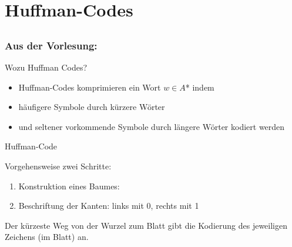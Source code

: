 

\section{Huffman-Codes}
\subsection*{}
\begin{frame}
	\frametitle{Aus der Vorlesung:}
	\begin{block}{Wozu Huffman Codes?}
    		\begin{itemize}
              \item Huffman-Codes komprimieren ein Wort $w \in A$* indem \pause
              \item häufigere Symbole durch kürzere Wörter \pause
              \item und seltener vorkommende Symbole durch längere Wörter kodiert werden
            \end{itemize}
    	\end{block}
\end{frame}

\begin{frame}{Huffman-Code}
	\begin{block}{Vorgehensweise}
		zwei Schritte:
    		\begin{enumerate}
			\item Konstruktion eines Baumes:
				\begin{itemize}
				\end{itemize}
			\item Beschriftung der Kanten: links mit 0, rechts mit 1
		\end{enumerate}
		Der kürzeste Weg von der Wurzel zum Blatt gibt die Kodierung des jeweiligen Zeichens (im Blatt) an.
    	\end{block}
\end{frame}

